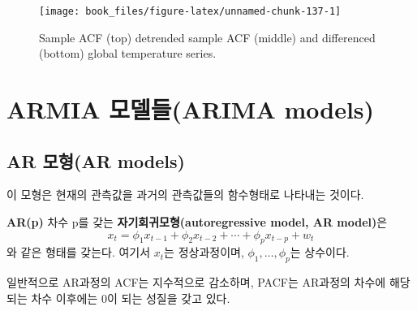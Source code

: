 \documentclass[b5paper,]{scrbook}
\theoremstyle{plain}
\theoremstyle{definition}
\numberwithin{equation}{section}
\let\BeginKnitrBlock\begin \let\EndKnitrBlock\end
\begin{document}
\begin{figure}

{\centering \texttt{[image: book\_files/figure-latex/unnamed-chunk-137-1]} 

}

\caption{Sample ACF (top) detrended sample ACF (middle) and differenced (bottom) global temperature series.}\label{fig:unnamed-chunk-137}
\end{figure}

\section{ARMIA 모델들(ARIMA models)}\label{armia-arima-models}

\subsection{AR 모형(AR models)}\label{ar-ar-models}

이 모형은 현재의 관측값을 과거의 관측값들의 함수형태로 나타내는 것이다.

\BeginKnitrBlock{definition}[자기회귀모형]
\protect\hypertarget{def:unnamed-chunk-138}{}{\label{def:unnamed-chunk-138}
{} }\textbf{AR(p)} 차수 p를 갖는
\textbf{자기회귀모형(autoregressive model, AR model)}은
\[x_{t}=\phi_{1}x_{t-1}+\phi_{2}x_{t-2} + \cdots + \phi_{p}x_{t-p}+w_{t}\]
와 같은 형태를 갖는다. 여기서 \(x_{t}\)는 정상과정이며,
\(\phi_{1},\ldots , \phi_{p}\)는 상수이다.
\EndKnitrBlock{definition}

일반적으로 AR과정의 ACF는 지수적으로 감소하며, PACF는 AR과정의 차수에
해당되는 차수 이후에는 0이 되는 성질을 갖고 있다.
\end{document}
